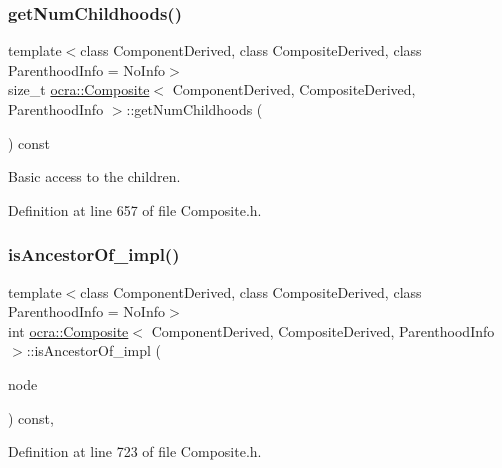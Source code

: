 \subsubsection{\texorpdfstring{get\+Num\+Childhoods()}{getNumChildhoods()}}
{\footnotesize\ttfamily template$<$class Component\+Derived, class Composite\+Derived, class Parenthood\+Info = No\+Info$>$ \\
size\+\_\+t \hyperlink{classocra_1_1Composite}{ocra\+::\+Composite}$<$ Component\+Derived, Composite\+Derived, Parenthood\+Info $>$\+::get\+Num\+Childhoods (\begin{DoxyParamCaption}{ }\end{DoxyParamCaption}) const\hspace{0.3cm}{\ttfamily [inline]}}



Basic access to the children. 



Definition at line 657 of file Composite.\+h.

\hypertarget{classocra_1_1Composite_aec6dc98deb22fb10e21ce1cf1c0314a7}{}\label{classocra_1_1Composite_aec6dc98deb22fb10e21ce1cf1c0314a7} 
\subsubsection{\texorpdfstring{is\+Ancestor\+Of\+\_\+impl()}{isAncestorOf\_impl()}}
{\footnotesize\ttfamily template$<$class Component\+Derived, class Composite\+Derived, class Parenthood\+Info = No\+Info$>$ \\
int \hyperlink{classocra_1_1Composite}{ocra\+::\+Composite}$<$ Component\+Derived, Composite\+Derived, Parenthood\+Info $>$\+::is\+Ancestor\+Of\+\_\+impl (\begin{DoxyParamCaption}\item[{const Component\+Derived \&}]{node }\end{DoxyParamCaption}) const\hspace{0.3cm}{\ttfamily [inline]}, {\ttfamily [protected]}}



Definition at line 723 of file Composite.\+h.

\hypertarget{classocra_1_1Composite_a7d241ce8b7c6410c021a9314773fe7d3}{}\label{classocra_1_1Composite_a7d241ce8b7c6410c021a9314773fe7d3} 
